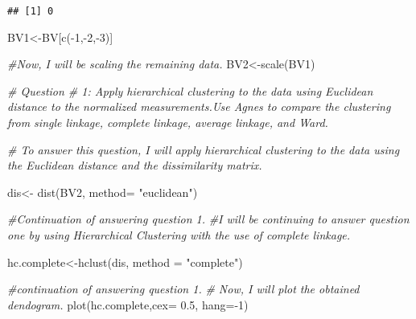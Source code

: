 \documentclass[
]{article}
\newenvironment{Shaded}{\begin{snugshade}}{\end{snugshade}}
\newcommand{\AttributeTok}[1]{\textcolor[rgb]{0.77,0.63,0.00}{#1}}
\newcommand{\CommentTok}[1]{\textcolor[rgb]{0.56,0.35,0.01}{\textit{#1}}}
\newcommand{\DecValTok}[1]{\textcolor[rgb]{0.00,0.00,0.81}{#1}}
\newcommand{\FloatTok}[1]{\textcolor[rgb]{0.00,0.00,0.81}{#1}}
\newcommand{\FunctionTok}[1]{\textcolor[rgb]{0.00,0.00,0.00}{#1}}
\newcommand{\NormalTok}[1]{#1}
\newcommand{\OtherTok}[1]{\textcolor[rgb]{0.56,0.35,0.01}{#1}}
\newcommand{\SpecialCharTok}[1]{\textcolor[rgb]{0.00,0.00,0.00}{#1}}
\newcommand{\StringTok}[1]{\textcolor[rgb]{0.31,0.60,0.02}{#1}}
\begin{document}
\begin{verbatim}
## [1] 0
\end{verbatim}

\begin{Shaded}
\begin{Highlighting}[]
\NormalTok{BV1}\OtherTok{\textless{}{-}}\NormalTok{BV[}\FunctionTok{c}\NormalTok{(}\SpecialCharTok{{-}}\DecValTok{1}\NormalTok{,}\SpecialCharTok{{-}}\DecValTok{2}\NormalTok{,}\SpecialCharTok{{-}}\DecValTok{3}\NormalTok{)]}
\end{Highlighting}
\end{Shaded}

\begin{Shaded}
\begin{Highlighting}[]
\CommentTok{\#Now, I will be scaling the remaining data. }
\NormalTok{BV2}\OtherTok{\textless{}{-}}\FunctionTok{scale}\NormalTok{(BV1)}
\end{Highlighting}
\end{Shaded}

\begin{Shaded}
\begin{Highlighting}[]
\CommentTok{\# Question \# 1: Apply hierarchical clustering to the data using Euclidean distance to the normalized measurements.Use Agnes to compare the clustering from single linkage, complete linkage, average linkage, and Ward. }

\CommentTok{\# To answer this question, I will apply hierarchical clustering to the data using the Euclidean distance and the dissimilarity matrix. }

\NormalTok{dis}\OtherTok{\textless{}{-}} \FunctionTok{dist}\NormalTok{(BV2, }\AttributeTok{method=} \StringTok{"euclidean"}\NormalTok{)}
\end{Highlighting}
\end{Shaded}

\begin{Shaded}
\begin{Highlighting}[]
\CommentTok{\#Continuation of answering question 1.}
\CommentTok{\#I will be continuing to answer question one by using Hierarchical Clustering with the use of complete linkage. }

\NormalTok{hc.complete}\OtherTok{\textless{}{-}}\FunctionTok{hclust}\NormalTok{(dis, }\AttributeTok{method =} \StringTok{"complete"}\NormalTok{)}
\end{Highlighting}
\end{Shaded}

\begin{Shaded}
\begin{Highlighting}[]
\CommentTok{\#continuation of answering question 1.}
\CommentTok{\# Now, I will plot the obtained dendogram. }
\FunctionTok{plot}\NormalTok{(hc.complete,}\AttributeTok{cex=} \FloatTok{0.5}\NormalTok{, }\AttributeTok{hang=}\SpecialCharTok{{-}}\DecValTok{1}\NormalTok{)}
\end{Highlighting}
\end{Shaded}
\end{document}
